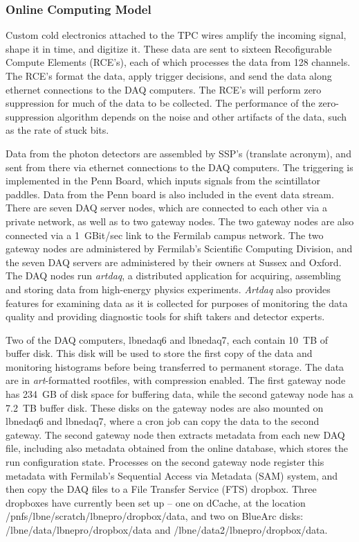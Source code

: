 \subsubsection{Online Computing Model}

Custom cold electronics attached to the TPC wires amplify the incoming signal, shape it in time,
and digitize it.  These data are sent to sixteen Recofigurable Compute Elements (RCE's), each of which
processes the data from 128 channels.  The RCE's format the data, apply trigger decisions, and send the
data along ethernet connections to the DAQ computers.  The RCE's will perform zero suppression for
much of the data to be collected.  The performance of the zero-suppression algorithm depends on the
noise and other artifacts of the data, such as the rate of stuck bits.

Data from the photon detectors are assembled
by SSP's (translate acronym), and sent from there via ethernet connections to the DAQ computers.  The
triggering is implemented in the Penn Board, which inputs signals from the scintillator paddles.  Data
from the Penn board is also included in the event data stream.
There are seven DAQ server nodes, which are
connected to each other via a private network, as well as to two gateway nodes.  The two gateway nodes
are also connected via a 1~GBit/sec link to the Fermilab campus network.  The two gateway nodes are
administered by Fermilab's Scientific Computing Division, and the seven DAQ servers are administered
by their owners at Sussex and Oxford.  The DAQ nodes run
{\it artdaq}, a distributed application for acquiring, assembling and storing data from high-energy
physics experiments.  {\it Artdaq} also provides features for examining data as it is collected for
purposes of monitoring the data quality and providing diagnostic tools for shift takers and detector
experts.

Two of the DAQ computers, lbnedaq6 and lbnedaq7, each contain 10~TB of buffer disk.  This disk will
be used to store the first copy of the data and monitoring histograms before being transferred
to permanent storage.  The data are in {\it art}-formatted rootfiles, with compression enabled.
The first gateway node has 234~GB of disk space for buffering data, while
the second gateway node has a 7.2~TB buffer disk.  These disks on the gateway nodes are also mounted
on lbnedaq6 and lbnedaq7, where a cron job can copy the data to the second gateway.  The second gateway
node then extracts metadata from each new DAQ file, including also metadata obtained from the online
database, which stores the run configuration state.  Processes on the second gateway node
 register this metadata with Fermilab's 
Sequential Access via Metadata (SAM) system, and then copy the DAQ files to a File Transfer Service
(FTS) dropbox.  Three dropboxes have currently been set up -- one on dCache, at the location
/pnfs/lbne/scratch/lbnepro/dropbox/data, and two on BlueArc disks:  /lbne/data/lbnepro/dropbox/data and
/lbne/data2/lbnepro/dropbox/data.

